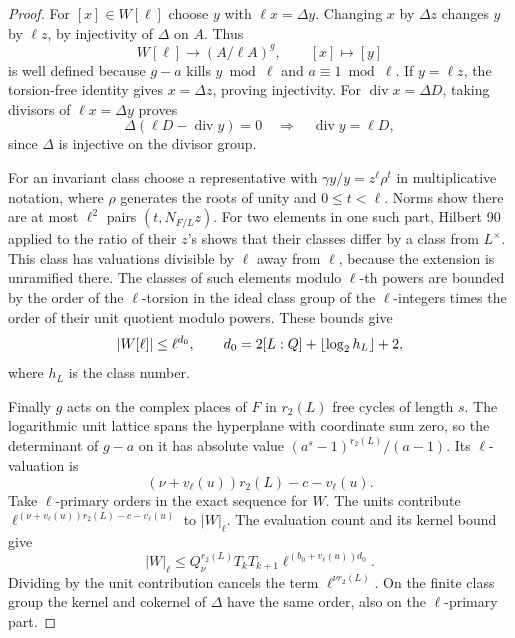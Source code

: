 \begin{proof}
For \([x]\in W[\ell]\) choose \(y\) with \(\ell x=\Delta y\).
Changing \(x\) by \(\Delta z\) changes \(y\) by \(\ell z\),
by injectivity of \(\Delta\) on \(A\). Thus
\[
 W[\ell]\longrightarrow (A/\ell A)^g,\qquad [x]\longmapsto[y]
\]
is well defined because \(g- a\) kills \(y\bmod\ell\)
and \(a\equiv1\bmod\ell\). If \(y=\ell z\), the torsion-free
identity gives \(x=\Delta z\), proving injectivity.
For \(\operatorname{div}x=\Delta D\), taking divisors of
\(\ell x=\Delta y\) proves
\[
 \Delta(\ell D-\operatorname{div}y)=0
                       \quad\Longrightarrow\quad\operatorname{div}y=\ell D,
\]
since \(\Delta\) is injective on the divisor group.

For an invariant class choose a representative with
\(\gamma y/y=z^\ell \rho^t\) in multiplicative notation,
where \(\rho\) generates the roots of unity and
\(0\le t<\ell\). Norms show there are at most
\(\ell^2\) pairs \((t,N_{F/L}z)\). For two elements in one
such part, Hilbert 90 applied to the ratio of their
\(z\)'s shows that their classes differ by a class from
\(L^\times\). This class has valuations divisible by
\(\ell\) away from \(\ell\), because the extension is
unramified there. The classes of such elements modulo
\(\ell\)-th powers are bounded by the order of the
\(\ell\)-torsion in the ideal class group of the
\(\ell\)-integers times the order of their unit quotient
modulo powers. These bounds give
\[
             |W[\ell]|\le\ell^{d_0},
             \qquad d_0=2[L:Q]+\lfloor\log_2 h_L\rfloor+2 ,
\]
where \(h_L\) is the class number.


Finally \(g\) acts on the complex places of \(F\) in
\(r_2(L)\) free cycles of length \(s\). The logarithmic
unit lattice spans the hyperplane with coordinate sum
zero, so the determinant of \(g-a\) on it has absolute
value \((a^s-1)^{r_2(L)}/(a-1)\). Its \(\ell\)-valuation is
\[
           (\nu+v_\ell(u))r_2(L)-c-v_\ell(u).
\]
Take \(\ell\)-primary orders in the exact sequence for \(W\).
The units contribute
\(\ell^{(\nu+v_\ell(u))r_2(L)-c-v_\ell(u)}\) to \(|W|_\ell\).
The evaluation count and its kernel bound give
\[
 |W|_\ell\le
 Q_\nu^{r_2(L)}T_kT_{k+1}\ell^{(b_0+v_\ell(u))d_0}.
\]
Dividing by the unit contribution cancels the term
\(\ell^{\nu r_2(L)}\). On the finite class group the
kernel and cokernel of \(\Delta\) have the same order,
also on the \(\ell\)-primary part.


\end{proof}
